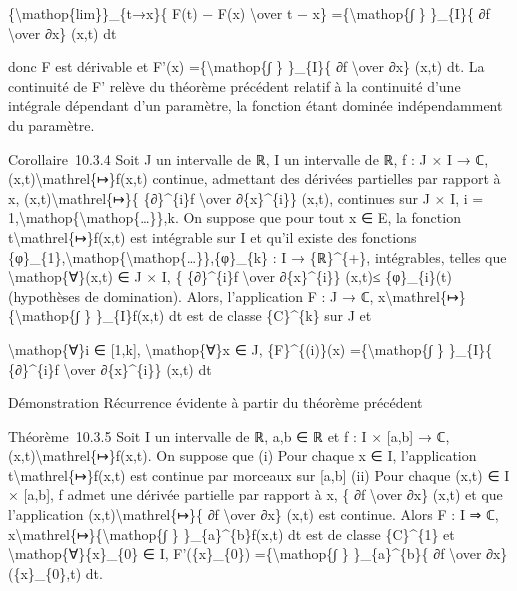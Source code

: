 \documentclass[]{article}
\begin{document}
\{\textbackslash{}mathop\{lim\}\}\_\{t→x\}\{ F(t) − F(x)
\textbackslash{}over t − x\} =\{\textbackslash{}mathop\{∫ \} \}\_\{I\}\{
∂f \textbackslash{}over ∂x\} (x,t) dt

donc F est dérivable et F'(x) =\{\textbackslash{}mathop\{∫ \}
\}\_\{I\}\{ ∂f \textbackslash{}over ∂x\} (x,t) dt. La continuité de F'
relève du théorème précédent relatif à la continuité d'une intégrale
dépendant d'un paramètre, la fonction étant dominée indépendamment du
paramètre.

Corollaire~10.3.4 Soit J un intervalle de ℝ, I un intervalle de ℝ, f : J
× I → ℂ, (x,t)\textbackslash{}mathrel\{↦\}f(x,t) continue, admettant des
dérivées partielles par rapport à x, (x,t)\textbackslash{}mathrel\{↦\}\{
\{∂\}\^{}\{i\}f \textbackslash{}over ∂\{x\}\^{}\{i\}\} (x,t), continues
sur J × I, i =
1,\textbackslash{}mathop\{\textbackslash{}mathop\{\ldots{}\}\},k. On
suppose que pour tout x ∈ E, la fonction
t\textbackslash{}mathrel\{↦\}f(x,t) est intégrable sur I et qu'il existe
des fonctions
\{φ\}\_\{1\},\textbackslash{}mathop\{\textbackslash{}mathop\{\ldots{}\}\},\{φ\}\_\{k\}
: I → \{ℝ\}\^{}\{+\}, intégrables, telles que
\textbackslash{}mathop\{∀\}(x,t) ∈ J × I, \textbar{}\{ \{∂\}\^{}\{i\}f
\textbackslash{}over ∂\{x\}\^{}\{i\}\} (x,t)\textbar{}≤ \{φ\}\_\{i\}(t)
(hypothèses de domination). Alors, l'application F : J → ℂ,
x\textbackslash{}mathrel\{↦\}\{\textbackslash{}mathop\{∫ \}
\}\_\{I\}f(x,t) dt est de classe \{C\}\^{}\{k\} sur J et

\textbackslash{}mathop\{∀\}i ∈ {[}1,k{]}, \textbackslash{}mathop\{∀\}x ∈
J, \{F\}\^{}\{(i)\}(x) =\{\textbackslash{}mathop\{∫ \} \}\_\{I\}\{
\{∂\}\^{}\{i\}f \textbackslash{}over ∂\{x\}\^{}\{i\}\} (x,t) dt

Démonstration Récurrence évidente à partir du théorème précédent

Théorème~10.3.5 Soit I un intervalle de ℝ, a,b ∈ ℝ et f : I × {[}a,b{]}
→ ℂ, (x,t)\textbackslash{}mathrel\{↦\}f(x,t). On suppose que (i) Pour
chaque x ∈ I, l'application t\textbackslash{}mathrel\{↦\}f(x,t) est
continue par morceaux sur {[}a,b{]} (ii) Pour chaque (x,t) ∈ I ×
{[}a,b{]}, f admet une dérivée partielle par rapport à x, \{ ∂f
\textbackslash{}over ∂x\} (x,t) et que l'application
(x,t)\textbackslash{}mathrel\{↦\}\{ ∂f \textbackslash{}over ∂x\} (x,t)
est continue. Alors F : I ⇒ ℂ,
x\textbackslash{}mathrel\{↦\}\{\textbackslash{}mathop\{∫ \}
\}\_\{a\}\^{}\{b\}f(x,t) dt est de classe \{C\}\^{}\{1\} et
\textbackslash{}mathop\{∀\}\{x\}\_\{0\} ∈ I, F'(\{x\}\_\{0\})
=\{\textbackslash{}mathop\{∫ \} \}\_\{a\}\^{}\{b\}\{ ∂f
\textbackslash{}over ∂x\} (\{x\}\_\{0\},t) dt.
\end{document}
